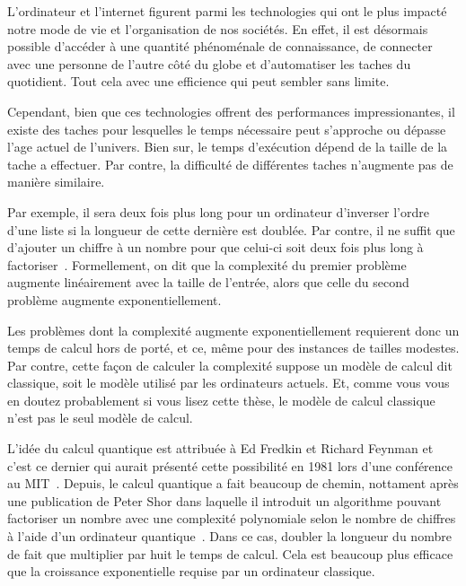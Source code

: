 \begin{comment}
\end{comment}

\Introduction   %

L'ordinateur et l'internet figurent parmi les technologies qui ont le plus impacté
notre mode de vie et l'organisation de nos sociétés.
En effet,
il est désormais possible d'accéder à une quantité phénoménale de connaissance,
de connecter avec une personne de l'autre côté du globe
et d'automatiser les taches du quotidient.
Tout cela avec une efficience qui peut sembler sans limite.

Cependant, 
bien que ces technologies offrent des performances impressionantes,
il existe des taches pour lesquelles le temps nécessaire peut s'approche ou
dépasse l'age actuel de l'univers.
Bien sur,
le temps d'exécution dépend de la taille de la tache a effectuer.
Par contre, 
la difficulté de différentes taches n'augmente pas de manière similaire.

Par exemple,
il sera deux fois plus long pour un ordinateur d'inverser l'ordre d'une liste 
si la longueur de cette dernière est doublée.
Par contre,
il ne suffit que d'ajouter un chiffre à un nombre pour que celui-ci soit deux 
fois plus long à factoriser~\cite{arora_computational_2009}.
Formellement,
on dit que la complexité du premier problème augmente linéairement avec la taille de l'entrée,
alors que celle du second problème augmente exponentiellement.

Les problèmes dont la complexité augmente exponentiellement requierent donc un temps de calcul
hors de porté, et ce, même pour des instances de tailles modestes.
Par contre,
cette façon de calculer la complexité suppose un modèle de calcul dit classique,
soit le modèle utilisé par les ordinateurs actuels.
Et,
comme vous vous en doutez probablement si vous lisez cette thèse,
le modèle de calcul classique n'est pas le seul modèle de calcul.

L'idée du calcul quantique est attribuée à Ed Fredkin et Richard Feynman et 
c'est ce dernier qui aurait présenté cette possibilité en 1981 lors d'une conférence au MIT~\cite{hoofnagle_birth_2021}.
Depuis,
le calcul quantique a fait beaucoup de chemin,
nottament après une publication de Peter Shor dans laquelle il introduit un 
algorithme pouvant factoriser un nombre avec une complexité polynomiale selon
le nombre de chiffres à l'aide d'un ordinateur quantique~\cite{shor_algorithms_1994}.
Dans ce cas,
doubler la longueur du nombre de fait que multiplier par huit le temps de calcul.
Cela est beaucoup plus efficace que la croissance exponentielle requise par un ordinateur classique.

